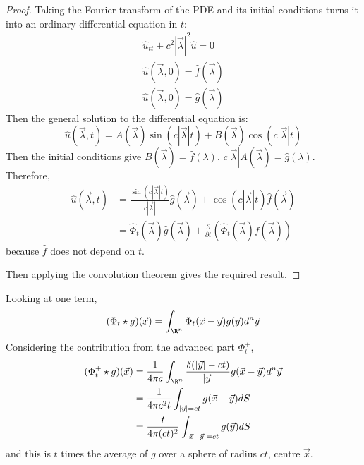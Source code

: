 \documentclass[../Main.tex]{subfiles}
\begin{document}
\begin{proof}
    Taking the Fourier transform of the PDE and its initial conditions turns it into an ordinary differential equation in $t$:
    \begin{gather*}
        \hat{u}_{tt} + c^2 |\vec{\lambda}|^2 \hat{u} = 0 \\
        \hat{u}(\vec{\lambda}, 0) = \hat{f}(\vec{\lambda}) \\
        \hat{u}(\vec{\lambda}, 0) = \hat{g}(\vec{\lambda})
    \end{gather*}
    Then the general solution to the differential equation is:
    \begin{equation*}
        \hat{u}(\vec{\lambda}, t) = A(\vec{\lambda}) \sin(c|\vec{\lambda}|t) + B(\vec{\lambda})\cos(c|\vec{\lambda}|t)
    \end{equation*}
    Then the initial conditions give $B(\vec{\lambda}) = \hat{f}(\lambda)$, $c|\vec{\lambda}| A(\vec{\lambda}) = \hat{g}(\lambda)$.
    Therefore,
    \begin{align*}
        \hat{u}(\vec{\lambda}, t) &= \frac{\sin(c|\vec{\lambda}|t)}{c|\vec{\lambda}|} \hat{g}(\vec{\lambda}) + \cos(c|\vec{\lambda}|t) \hat{f}(\vec{\lambda}) \\
        &= \hat{\Phi}_t(\vec{\lambda}) \hat{g}(\vec{\lambda}) + \frac{\partial}{\partial t} \left(\hat{\Phi}_t(\vec{\lambda}) f(\vec{\lambda})\right)
    \end{align*}
    because $\hat{f}$ does not depend on $t$.

    Then applying the convolution theorem gives the required result.
\end{proof}
Looking at one term,
\begin{equation*}
    (\Phi_t \star g)(\vec{x}) = \int_{\R^n} \Phi_t(\vec{x} - \vec{y}) g(\vec{y}) d^n \vec{y}
\end{equation*}
Considering the contribution from the advanced part $\Phi_t^+$,
\begin{align*}
    (\Phi_t^+ \star g)(\vec{x}) &= \frac{1}{4\pi c} \int_{\R^n} \frac{\delta(|\vec{y}| - ct)}{|\vec{y}|} g(\vec{x} - \vec{y}) d^n \vec{y} \\
    &= \frac1{4\pi c^2 t} \int_{|\vec{y}| = ct} g(\vec{x} - \vec{y}) dS \\
    &= \frac{t}{4\pi(ct)^2} \int_{|\vec{x} - \vec{y}| = ct} g(\vec{y}) dS
\end{align*}
and this is $t$ times the average of $g$ over a sphere of radius $ct$, centre $\vec{x}$.
\end{document}
